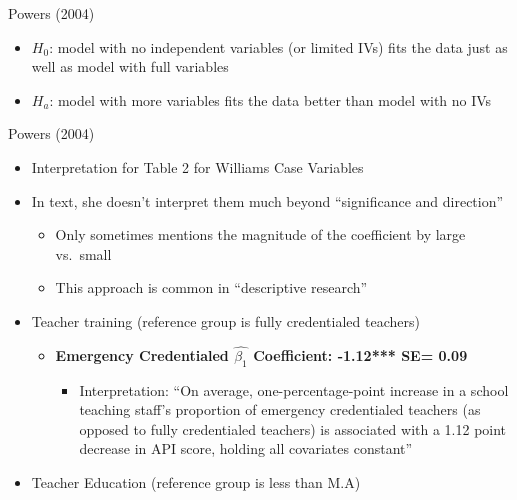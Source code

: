 \documentclass[8pt,ignorenonframetext,dvipsnames]{beamer}
\providecommand{\tightlist}{%
  \setlength{\itemsep}{0pt}\setlength{\parskip}{0pt}}
\renewcommand{\textbf}[1]{{\color{darkgray}\bfseries\fontfamily{Montserrat-TOsF}#1}}
\let\olditem\item
\renewcommand{\item}{%
  \olditem\vspace{4pt}
}
\begin{document}
\begin{frame}{Powers (2004)}
\begin{itemize}
\begin{itemize}
    \begin{itemize}
    \tightlist
    \item
      \(H_0\): model with no independent variables (or limited IVs) fits
      the data just as well as model with full variables
    \item
      \(H_a\): model with more variables fits the data better than model
      with no IVs
    \end{itemize}
  \end{itemize}
\end{itemize}

\end{frame}

\begin{frame}{Powers (2004)}
\protect\hypertarget{powers-2004-2}{}

\begin{itemize}
\tightlist
\item
  Interpretation for Table 2 for Williams Case Variables
\item
  In text, she doesn't interpret them much beyond ``significance and
  direction''

  \begin{itemize}
  \tightlist
  \item
    Only sometimes mentions the magnitude of the coefficient by large
    vs.~small
  \item
    This approach is common in ``descriptive research''
  \end{itemize}
\item
  Teacher training (reference group is fully credentialed teachers)

  \begin{itemize}
  \tightlist
  \item
    \textbf{Emergency Credentialed \(\hat{\beta_1}\) Coefficient:
    -1.12*** SE= 0.09}

    \begin{itemize}
    \tightlist
    \item
      Interpretation: ``On average, one-percentage-point increase in a
      school teaching staff's proportion of emergency credentialed
      teachers (as opposed to fully credentialed teachers) is associated
      with a 1.12 point decrease in API score, holding all covariates
      constant''
    \end{itemize}
  \end{itemize}
\item
  Teacher Education (reference group is less than M.A)


\end{itemize}
\end{frame}
\end{document}
